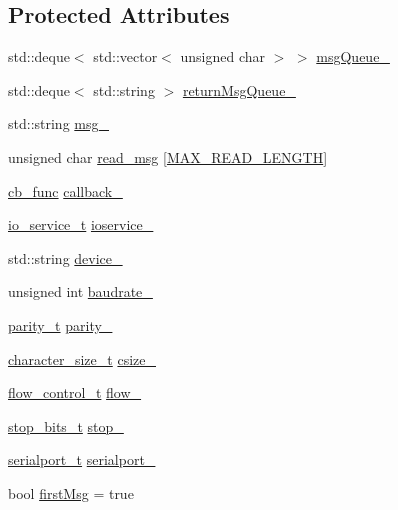 \subsection*{Protected Attributes}
\begin{DoxyCompactItemize}
\item 
std\+::deque$<$ std\+::vector$<$ unsigned char $>$ $>$ \hyperlink{classo_cpt_1_1protocol_1_1_serial_a220138abdeaa8734f9f9b1b1ecd8ccd8}{msg\+Queue\+\_\+}
\item 
std\+::deque$<$ std\+::string $>$ \hyperlink{classo_cpt_1_1protocol_1_1_serial_aeed234980f18b4b66f8c88c50d6188f8}{return\+Msg\+Queue\+\_\+}
\item 
std\+::string \hyperlink{classo_cpt_1_1protocol_1_1_serial_a418ed31316844cd2ea8bc6edd89e9619}{msg\+\_\+}
\item 
unsigned char \hyperlink{classo_cpt_1_1protocol_1_1_serial_a74e416bfc7291e2eee8964c9cc670368}{read\+\_\+msg} \mbox{[}\hyperlink{_controller_8h_a5380750991f1b5aeaa5393d5bdeac7ef}{M\+A\+X\+\_\+\+R\+E\+A\+D\+\_\+\+L\+E\+N\+G\+TH}\mbox{]}
\item 
\hyperlink{classo_cpt_1_1protocol_1_1_serial_ad55591180be8bea2fe3832b1265b7496}{cb\+\_\+func} \hyperlink{classo_cpt_1_1protocol_1_1_serial_a653c57dab573b8f0d6d06e0f1443d045}{callback\+\_\+}
\item 
\hyperlink{classo_cpt_1_1protocol_1_1_serial_ac9305799ef4be4eb50f1274184492f04}{io\+\_\+service\+\_\+t} \hyperlink{classo_cpt_1_1protocol_1_1_serial_a313201e80bdb7495b837960c16d244a2}{ioservice\+\_\+}
\item 
std\+::string \hyperlink{classo_cpt_1_1protocol_1_1_serial_aef59f7008f19eb073071a836b923c47e}{device\+\_\+}
\item 
unsigned int \hyperlink{classo_cpt_1_1protocol_1_1_serial_ad24eda3d37c870d3f83af0a67d63d2ae}{baudrate\+\_\+}
\item 
\hyperlink{classo_cpt_1_1protocol_1_1_serial_aae21a39fe2f321475ca19d46bf40d5f3}{parity\+\_\+t} \hyperlink{classo_cpt_1_1protocol_1_1_serial_a2b7e174e85959fcb20bb9cb26fecafc1}{parity\+\_\+}
\item 
\hyperlink{classo_cpt_1_1protocol_1_1_serial_a8799e83d5d812132c296dd4a6a17d6f6}{character\+\_\+size\+\_\+t} \hyperlink{classo_cpt_1_1protocol_1_1_serial_ab64a625816c6697c301c5d6c79612044}{csize\+\_\+}
\item 
\hyperlink{classo_cpt_1_1protocol_1_1_serial_ad32f1d64fb16a5443d7aae92e8b14232}{flow\+\_\+control\+\_\+t} \hyperlink{classo_cpt_1_1protocol_1_1_serial_a08eb8b737e453a84f6db746c79c0fab1}{flow\+\_\+}
\item 
\hyperlink{classo_cpt_1_1protocol_1_1_serial_aadc4c803ade35920211e6c6a202a8c1f}{stop\+\_\+bits\+\_\+t} \hyperlink{classo_cpt_1_1protocol_1_1_serial_a0905cfeb2f2e21ce6a141e068813f75c}{stop\+\_\+}
\item 
\hyperlink{classo_cpt_1_1protocol_1_1_serial_a3949fae08041279672bcb29b94d4cd52}{serialport\+\_\+t} \hyperlink{classo_cpt_1_1protocol_1_1_serial_a3297de5a49ff3956439fcd5c030c75a0}{serialport\+\_\+}
\item 
bool \hyperlink{classo_cpt_1_1protocol_1_1_serial_affbe5790cd34027fa6b65dbb98f5d5bc}{first\+Msg} = true
\end{DoxyCompactItemize}


